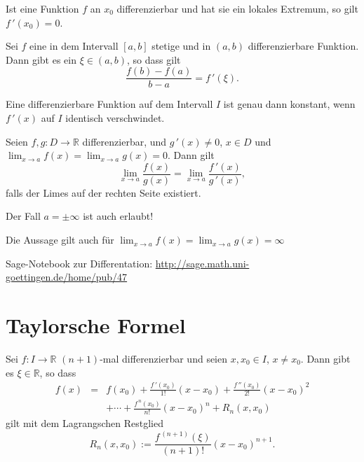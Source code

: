 \documentclass[a4paper,12pt,DIV15]{scrartcl}
\begin{document}
\begin{thm}
Ist eine Funktion $f$ an $x_0$ differenzierbar und hat sie ein
lokales Extremum, so gilt $f\,'(x_0)=0$.
\end{thm}
\begin{thm}[Mittelwertsatz] 
Sei $f$ eine in dem Intervall $[a,b]$ stetige
und in $(a,b)$ differenzierbare Funktion. Dann gibt es ein $\xi \in
(a,b)$, so dass gilt
\[ \frac{f(b)-f(a)}{b-a}= f\,'(\xi). \]  
\end{thm}
\begin{thm}
Eine differenzierbare Funktion auf dem Intervall $I$ ist genau
dann konstant, wenn $f\,'(x)$ auf $I$ identisch verschwindet.
 \end{thm}

\begin{defn}
Seien $f,g: D \rightarrow \mathbb{R}$
differenzierbar, und $g\,'(x) \neq 0$, $x \in D$ und 
{\color{red} $\lim_{x \rightarrow a} f(x) = \lim_{x \rightarrow a} g(x)= 0$}. Dann gilt
\[ \lim_{x \rightarrow a} \frac{f(x)}{g(x)} =  \lim_{x \rightarrow a}
\frac{f\,'(x)}{g\,'(x)}, \]
falls der Limes auf der rechten Seite existiert.

\end{defn}
\begin{bemerk}
Der Fall $a=\pm\infty$ ist auch erlaubt!

Die Aussage gilt auch für $\lim_{x \rightarrow a} f(x)=\lim_{x \rightarrow a} g(x)= \infty$ 
\end{bemerk}

 \begin{center}
     Sage-Notebook zur Differentation: 
     \url{http://sage.math.uni-goettingen.de/home/pub/47}
 \end{center}


\section{Taylorsche Formel}

\begin{thm}
Sei $f:I \rightarrow \mathbb{R}$ $(n+1)$-mal differenzierbar und seien
$x,x_0 \in I$, $x \neq x_0$. Dann gibt es $\xi \in \mathbb{R}$, so
dass
\begin{eqnarray*}
f(x)& = & f(x_0) + \frac{f\,'(x_0)}{1!}(x-x_0)+
\frac{f\,''(x_0)}{2!}(x-x_0)^2\\[0.5cm]
 & & + \cdots + \frac{f^{\,n}(x_0)}{n!}(x-x_0)^n +R_n(x,x_0) 
\end{eqnarray*}
gilt mit dem  {\color{red} Lagrangschen Restglied}
\[ R_n(x,x_0) := \frac{f^{\,(n+1)}(\xi)}{(n+1)!} (x-x_0)^{n+1}. \]
\end{thm}
\end{document}
